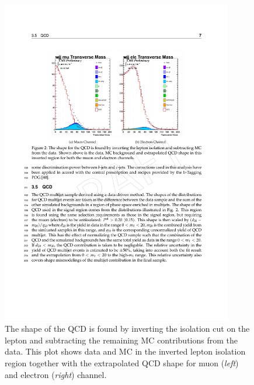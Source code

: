 \begin{figure}[htbp]
	\centering
		\includegraphics[width=0.9\textwidth]{Figures/QCD_CD.pdf}		
	\caption[QCD contribution using the inverted isolation selection.]{The shape of the QCD is found by inverting the isolation cut on the lepton and subtracting the remaining MC contributions from the data. This plot shows data and MC in the inverted lepton isolation region together with the extrapolated QCD shape for muon (\textit{left}) and electron (\textit{right}) channel.}
	\label{fig:QCD_CD}
\end{figure}

